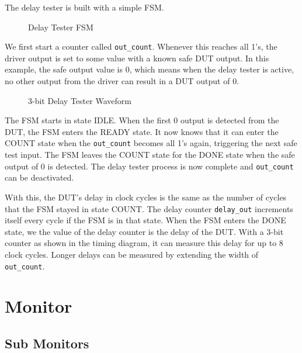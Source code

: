 The delay tester is built with a simple FSM.

\begin{figure}[H]
  \centering
  
  \caption{Delay Tester FSM}
  \label{DelayTesterFSM}
\end{figure}

We first start a counter called \texttt{out\_count}.
Whenever this reaches all 1's, the driver output is set to some value with a known safe DUT output.
In this example, the safe output value is 0, which means when the delay tester is active, no other output from the driver can result in a DUT output of 0.

\begin{figure}[H]
  \centering
  
  \caption{3-bit Delay Tester Waveform}
  \label{DelayTesterWF}
\end{figure}

The FSM starts in state IDLE.
When the first 0 output is detected from the DUT, the FSM enters the READY state.
It now knows that it can enter the COUNT state when the \texttt{out\_count} becomes all 1's again, triggering the next safe test input.
The FSM leaves the COUNT state for the DONE state when the safe output of 0 is detected.
The delay tester process is now complete and \texttt{out\_count} can be deactivated.

With this, the DUT's delay in clock cycles is the same as the number of cycles that the FSM stayed in state COUNT.
The delay counter \texttt{delay\_out} increments itself every cycle if the FSM is in that state.
When the FSM enters the DONE state, we the value of the delay counter is the delay of the DUT.
With a 3-bit counter as shown in the timing diagram, it can measure this delay for up to 8 clock cycles.
Longer delays can be measured by extending the width of \texttt{out\_count}.

\section{Monitor}



\subsection{Sub Monitors}

